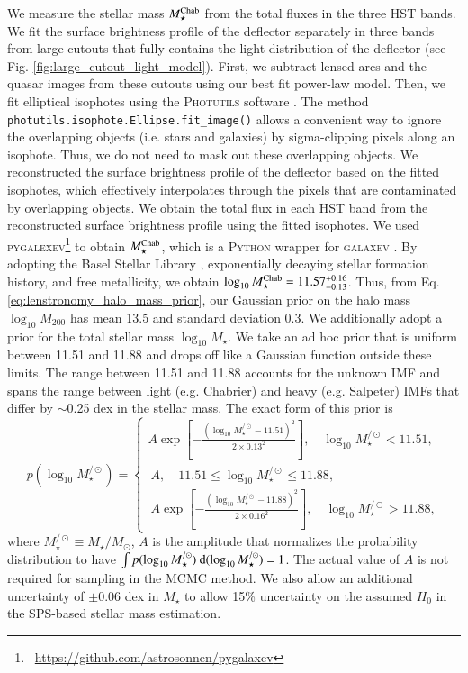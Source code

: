 \documentclass[longauth]{aa}
\newcommand{\rmd}{{\rm d}}
\newcommand{\ajs}[1]{{{#1}}}
\newcommand{\lreply}[1]{{{#1}}}
\begin{document}
We measure the stellar mass $M_{\star}^{\rm Chab}$ from the total fluxes in the three HST bands. We fit the surface brightness profile of the deflector separately in three bands from large cutouts that fully contains the light distribution of the deflector (see Fig. \ref{fig:large_cutout_light_model}). First, we subtract lensed arcs and the quasar images from these cutouts using our best fit power-law model. Then, we fit elliptical isophotes using the \textsc{Photutils} software \citep{Bradley20}. The method \texttt{photutils.isophote.Ellipse.fit\_image()} allows a convenient way to ignore the overlapping objects (i.e. stars and galaxies) by sigma-clipping pixels along an isophote. Thus, we do not need to mask out these overlapping objects. We reconstructed the surface brightness profile of the deflector based on the fitted isophotes, which effectively interpolates through the pixels that are contaminated by overlapping objects. We obtain the total flux in each HST band from the reconstructed surface brightness profile using the fitted isophotes. We used \textsc{pygalexev}\footnote{\faGithub\ \url{https://github.com/astrosonnen/pygalaxev}} to obtain $M_{\star}^{\rm Chab}$, which is a \textsc{Python} wrapper for \textsc{galaxev} \citep{Bruzual03}. By adopting the \lreply{Basel Stellar Library \citep[BaSeL;][]{Lejeune98}}, exponentially decaying stellar formation history, and free metallicity, we obtain $\log_{10} M_{\star}^{\rm Chab} = 11.57^{+0.16}_{-0.13}$. Thus, from Eq. \ref{eq:lenstronomy_halo_mass_prior}, our Gaussian prior on the halo mass $\log_{10} M_{200}$ has mean 13.5 and standard deviation 0.3.
%
We additionally adopt a prior for the total stellar mass $\log_{10} M_{\star}$. We take an ad hoc prior that is uniform between 11.51 and 11.88 and drops off like a Gaussian function outside these limits. The range between 11.51 and 11.88 accounts for the unknown IMF and spans the range between light (e.g. Chabrier) and heavy (e.g. Salpeter) IMFs that differ by $\sim$0.25 dex in the stellar mass. The exact form of this prior is
%
\begin{equation}
        p(\log_{10} M_{\star}^{/\odot}) =
     \begin{cases}
       A \exp \left[-\frac{(\log_{10} M_{\star}^{/\odot} - 11.51)^2}{2 \times 0.13^2}\right], \quad \log_{10} M_{\star}^{/\odot} < 11.51, \\\
       A , \quad 11.51 \leq \log_{10} M_{\star}^{/\odot} \leq 11.88, \\\
       A \exp \left[-\frac{(\log_{10} M_{\star}^{/\odot} - 11.88)^2}{2 \times 0.16^2}\right] , \quad \log_{10} M_{\star}^{/\odot} > 11.88,
     \end{cases}
\end{equation}
%
where $M_{\star}^{/\odot} \equiv M_{\star}/M_{\odot}$, $A$ is the amplitude that normalizes the probability distribution to have $\int p(\log_{10} M_{\star}^{/\odot}) \ \rmd (\log_{10} M_{\star}^{/\odot}) = 1$. The actual value of $A$ is not required for sampling in the MCMC method. \ajs{We also allow an additional uncertainty of $\pm$0.06 dex in $M_{\star}$ to allow 15\% uncertainty on the assumed $H_0$ in the SPS-based stellar mass estimation.}
\end{document}
